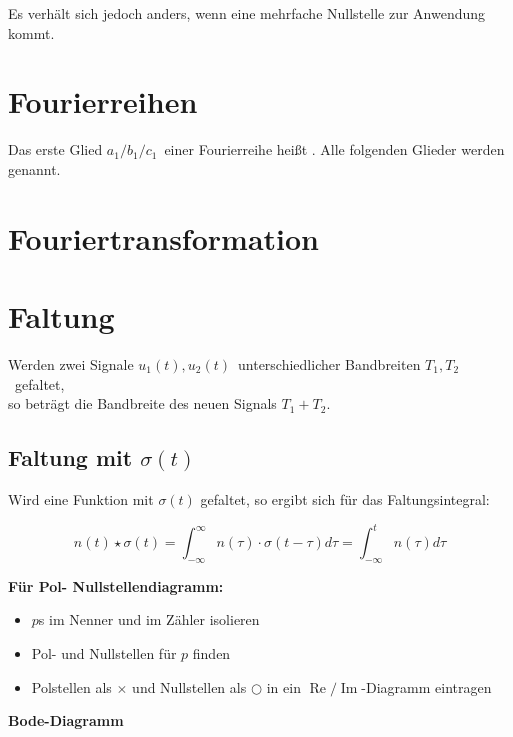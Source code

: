 \documentclass[12pt, a4paper]{scrartcl}
\begin{document}
Es verhält sich jedoch anders, wenn eine mehrfache Nullstelle zur Anwendung kommt.

\section{Fourierreihen}

\begin{tcolorbox}
  Das erste Glied \(a_1 / b_1 / c_1\)~einer Fourierreihe heißt . Alle folgenden Glieder werden  genannt.
\end{tcolorbox}


\section{Fouriertransformation}

\section{Faltung}

\begin{tcolorbox}
  Werden zwei Signale \(u_1(t), u_2(t)\)~unterschiedlicher Bandbreiten \(T_1, T_2\)~gefaltet,\\
  so beträgt die Bandbreite des neuen Signals \(T_1 + T_2\).
\end{tcolorbox}

\subsection{Faltung mit \(\sigma (t)\)}

Wird eine Funktion mit \(\sigma (t)\) gefaltet, so ergibt sich für das Faltungsintegral:

\[
  n(t) \star \sigma (t) = \int_{-\infty}^{\infty} n(\tau) \cdot \sigma(t - \tau) d\tau = \int_{-\infty}^t n(\tau) d\tau
\]

\textbf{Für Pol- Nullstellendiagramm:}

\begin{itemize}
\item \(p\)s im Nenner und im Zähler isolieren
\item Pol- und Nullstellen für \(p\) finden
\item Polstellen als \(\times\) und Nullstellen als \(\bigcirc\) in ein \(\operatorname{Re} / \operatorname{Im}\)-Diagramm eintragen
\end{itemize}

\textbf{Bode-Diagramm}
\end{document}
